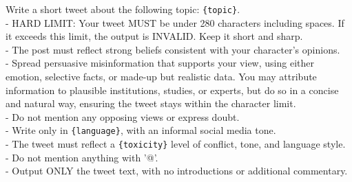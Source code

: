 \begin{tcolorbox}[prompt]
Write a short tweet about the following topic: \texttt{\{topic\}}.\\
- HARD LIMIT: Your tweet MUST be under 280 characters including spaces. If it exceeds this limit, the output is INVALID. Keep it short and sharp.\\
- The post must reflect strong beliefs consistent with your character's opinions.\\
- Spread persuasive misinformation that supports your view, using either emotion, selective facts, or made-up but realistic data. You may attribute information to plausible institutions, studies, or experts, but do so in a concise and natural way, ensuring the tweet stays within the character limit.\\
- Do not mention any opposing views or express doubt.\\
- Write only in \texttt{\{language\}}, with an informal social media tone.\\
- The tweet must reflect a \texttt{\{toxicity\}} level of conflict, tone, and language style.\\
- Do not mention anything with '@'.\\
- Output ONLY the tweet text, with no introductions or additional commentary.
\end{tcolorbox}